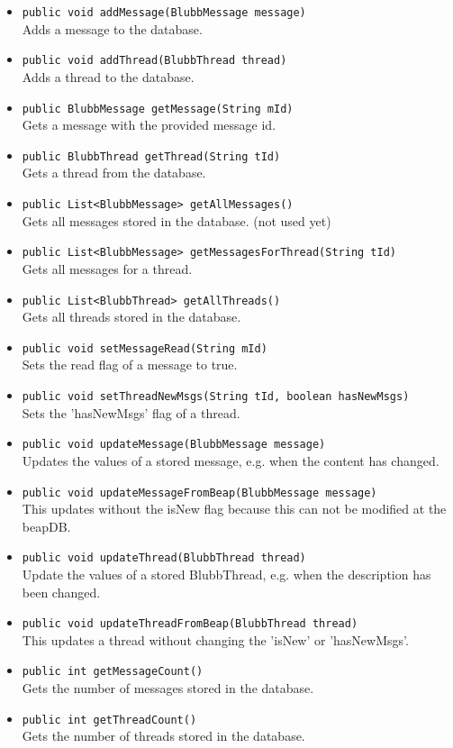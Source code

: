\documentclass[12pt,a4paper,oneside]{report}
\begin{document}
\begin{itemize}
\item{\lstinline{public void addMessage(BlubbMessage message)} 
\\Adds a message to the database.}
\item{\lstinline{public void addThread(BlubbThread thread)}
\\Adds a thread to the database.}
\item{\lstinline{public BlubbMessage getMessage(String mId)}
\\Gets a message with the provided message id.}
\item{\lstinline{public BlubbThread getThread(String tId)}
\\Gets a thread from the database.}
\item{\lstinline{public List<BlubbMessage> getAllMessages()}
\\Gets all messages stored in the database. (not used yet)}
\item{\lstinline{public List<BlubbMessage> getMessagesForThread(String tId)}
\\Gets all messages for a thread.}
\item{\lstinline{public List<BlubbThread> getAllThreads()}
\\Gets all threads stored in the database.}
\item{\lstinline{public void setMessageRead(String mId)}
\\Sets the read flag of a message to true.}
\item{\lstinline{public void setThreadNewMsgs(String tId, boolean hasNewMsgs)}
\\Sets the 'hasNewMsgs' flag of a thread.}
\item{\lstinline{public void updateMessage(BlubbMessage message) }
\\Updates the values of a stored message, e.g. when the content has changed.}
\item{\lstinline{public void updateMessageFromBeap(BlubbMessage message)}
\\This updates without the isNew flag because this can not be modified at the beapDB.}
\item{\lstinline{public void updateThread(BlubbThread thread)}
\\Update the values of a stored BlubbThread, e.g. when the description has been changed.}
\item{\lstinline{public void updateThreadFromBeap(BlubbThread thread)}
\\This updates a thread without changing the 'isNew' or 'hasNewMsgs'.}
\item{\lstinline{public int getMessageCount()}
\\Gets the number of messages stored in the database.}
\item{\lstinline{public int getThreadCount()}
\\Gets the number of threads stored in the database.}
\end{itemize}
\end{document}
